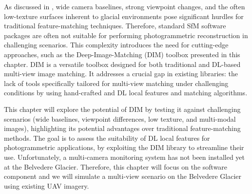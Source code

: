 As discussed in , wide camera baselines, strong viewpoint changes, and the often low-texture surfaces inherent to glacial environments pose significant hurdles for traditional feature-matching techniques.
Therefore, standard SfM software packages are often not suitable for performing photogrammetric reconstruction in challenging scenarios.
This complexity introduces the need for cutting-edge approaches, such as the Deep-Image-Matching (DIM) toolbox presented in this chapter.
DIM is a versatile toolbox designed for both traditional and DL-based multi-view image matching. 
It addresses a crucial gap in existing libraries: the lack of tools specifically tailored for multi-view matching under challenging conditions by using hand-crafted and DL local features and matching algorithms.

This chapter will explore the potential of DIM by testing it against challenging scenarios (wide baselines, viewpoint differences, low texture, and multi-modal images), highlighting its potential advantages over traditional feature-matching methods.  
The goal is to assess the suitability of DL local features for photogrammetric applications, by exploiting the DIM library to streamline their use. 
Unfortunately, a multi-camera monitoring system has not been installed yet at the Belvedere Glacier. 
Therefore, this chapter will focus on the software component and we will simulate a multi-view scenario on the Belvedere Glacier using existing UAV imagery. 


